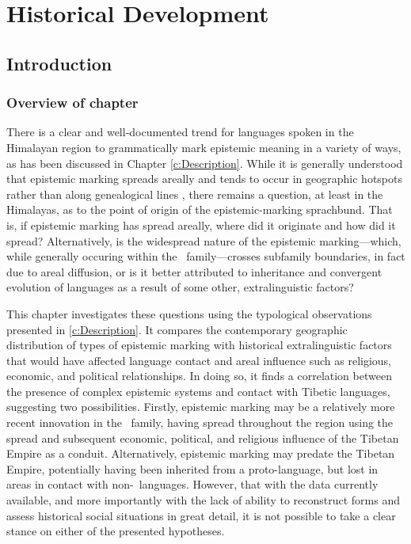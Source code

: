 \chapter{Historical Development}\label{c:History}
\section{Introduction}
\subsection{Overview of chapter}
There is a clear and well-documented trend for languages spoken in the Himalayan region to grammatically mark epistemic meaning in a variety of ways, as has been discussed in Chapter \ref{c:Description}. While it is generally understood that epistemic marking spreads areally and tends to occur in geographic hotspots rather than along genealogical lines \cites[288]{Aikhenvald2004}{SanRoque2012}{Verhees2018}, there remains a question, at least in the Himalayas, as to the point of origin of the epistemic-marking sprachbund. That is, if epistemic marking has spread areally, where did it originate and how did it spread? Alternatively, is the widespread nature of the epistemic marking---which, while generally occuring within the \lfam\ family---crosses subfamily boundaries, in fact due to areal diffusion, or is it better attributed to inheritance and convergent evolution of languages as a result of some other, extralinguistic factors?

This chapter investigates these questions using the typological observations presented in \cref{c:Description}. It compares the contemporary geographic distribution of types of epistemic marking with historical extralinguistic factors that would have affected language contact and areal influence such as religious, economic, and political relationships. In doing so, it finds a correlation between the presence of complex epistemic systems and contact with Tibetic languages, suggesting two possibilities. Firstly, epistemic marking may be a relatively more recent innovation in the \lfam\ family, having spread throughout the region using the spread and subsequent economic, political, and religious influence of the Tibetan Empire as a conduit. Alternatively, epistemic marking may predate the Tibetan Empire, potentially having been inherited from a proto-language, but lost in areas in contact with non-\lfam\ languages. However, that with the data currently available, and more importantly with the lack of ability to reconstruct forms and assess historical social situations in great detail, it is not possible to take a clear stance on either of the presented hypotheses.

